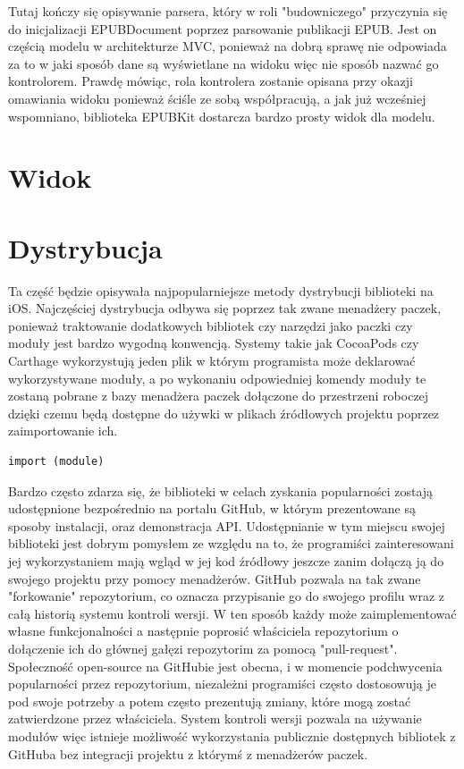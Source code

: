 Tutaj kończy się opisywanie parsera, który w roli "budowniczego" przyczynia się do inicjalizacji EPUBDocument poprzez parsowanie publikacji EPUB. Jest on częścią modelu w architekturze MVC, ponieważ na dobrą sprawę nie odpowiada za to w jaki sposób dane są wyświetlane na widoku więc nie sposób nazwać go kontrolorem. Prawdę mówiąc, rola kontrolera zostanie opisana przy okazji omawiania widoku ponieważ ściśle ze sobą współpracują, a jak już wcześniej wspomniano, biblioteka EPUBKit dostarcza bardzo prosty widok dla modelu.

\section{Widok}

\section{Dystrybucja}

Ta część będzie opisywała najpopularniejsze metody dystrybucji biblioteki na iOS. Najczęściej dystrybucja odbywa się poprzez tak zwane menadżery paczek, ponieważ traktowanie dodatkowych bibliotek czy narzędzi jako paczki czy moduły jest bardzo wygodną konwencją. Systemy takie jak CocoaPods czy Carthage wykorzystują jeden plik w którym programista może deklarować wykorzystywane moduły, a po wykonaniu odpowiedniej komendy moduły te zostaną pobrane z bazy menadżera paczek dołączone do przestrzeni roboczej dzięki czemu będą dostępne do używki w plikach źródłowych projektu poprzez zaimportowanie ich.

\begin{lstlisting}[language=swift-reference]
import (module)
\end{lstlisting}

Bardzo często zdarza się, że biblioteki w celach zyskania popularności zostają udostępnione bezpośrednio na portalu GitHub, w którym prezentowane są sposoby instalacji, oraz demonstracja API. Udostępnianie w tym miejscu swojej biblioteki jest dobrym pomysłem ze względu na to, że programiści zainteresowani jej wykorzystaniem mają wgląd w jej kod źródłowy jeszcze zanim dołączą ją do swojego projektu przy pomocy menadżerów. GitHub pozwala na tak zwane "forkowanie" repozytorium, co oznacza przypisanie go do swojego profilu wraz z całą historią systemu kontroli wersji. W ten sposób każdy może zaimplementować własne funkcjonalności a następnie poprosić właściciela repozytorium o dołączenie ich do głównej gałęzi repozytorim za pomocą "pull-request". Społeczność open-source na GitHubie jest obecna, i w momencie podchwycenia popularności przez repozytorium, niezależni programiści często dostosowują je pod swoje potrzeby a potem często prezentują zmiany, które mogą zostać zatwierdzone przez właściciela. System kontroli wersji pozwala na używanie modułów więc istnieje możliwość wykorzystania publicznie dostępnych bibliotek z GitHuba bez integracji projektu z którymś z menadżerów paczek.

